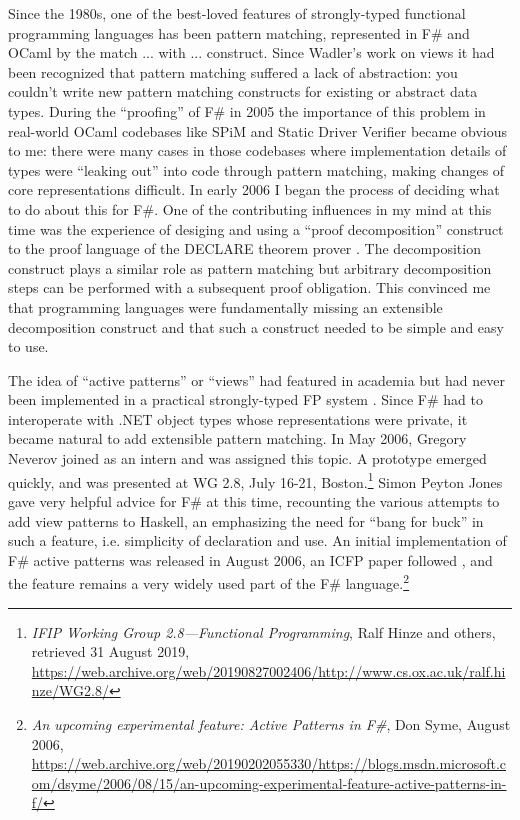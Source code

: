 \documentclass[acmsmall]{acmart}\settopmatter{}
\begin{document}
Since the 1980s, one of the best-loved features of strongly-typed functional programming languages has been pattern matching,
represented in F\# and OCaml by the match ... with ... construct. Since Wadler’s work on views \citep{Wadler1987} it had been
recognized that pattern matching suffered a lack of abstraction: you couldn’t write new pattern matching constructs for existing
or abstract data types.  During the “proofing” of F\# in 2005 the importance of this problem in real-world OCaml codebases like
SPiM and Static Driver Verifier became obvious to me: there were many cases in those codebases where implementation details
of types were “leaking out” into code through pattern matching, making changes of core representations difficult.  In early 2006
I began the process of deciding what to do about this for F\#.  One of the contributing influences in my mind at this time was the
experience of desiging and using a ``proof decomposition'' construct to the proof language of the DECLARE theorem prover \citep{Syme99threetactic}. The
decomposition construct plays a similar role as pattern matching but arbitrary
decomposition steps can be performed with a subsequent proof obligation.  This convinced me that programming languages were fundamentally missing
an extensible decomposition construct and that such a construct needed to be simple and easy to use.

The idea of “active patterns” or “views” had featured in academia but had never been implemented in a practical strongly-typed
FP system \citep{Erwig1996}.  Since F\# had to interoperate with .NET object types whose representations were private, it became
natural to add extensible pattern matching. In May 2006, Gregory Neverov joined as an intern and was assigned this topic.  A prototype
emerged quickly, and was presented at WG 2.8, July 16-21, Boston.\footnote{\textit{IFIP Working Group 2.8---Functional Programming}, Ralf
Hinze and others, retrieved 31 August 2019, \url{https://web.archive.org/web/20190827002406/http://www.cs.ox.ac.uk/ralf.hinze/WG2.8/}}  Simon
Peyton Jones gave very helpful advice for F\# at this time, recounting the various attempts to add view patterns to Haskell, an emphasizing the
need for “bang for buck” in such a feature, i.e. simplicity of declaration and use. An initial implementation of F\# active patterns was released
in August 2006, an ICFP paper followed \citep{Syme2007}, and the feature remains a very widely used part of the
F\# language.\footnote{\textit{An upcoming experimental feature: Active Patterns in F\#}, Don Syme, August 2006, \url{https://web.archive.org/web/20190202055330/https://blogs.msdn.microsoft.com/dsyme/2006/08/15/an-upcoming-experimental-feature-active-patterns-in-f/}}
\end{document}

